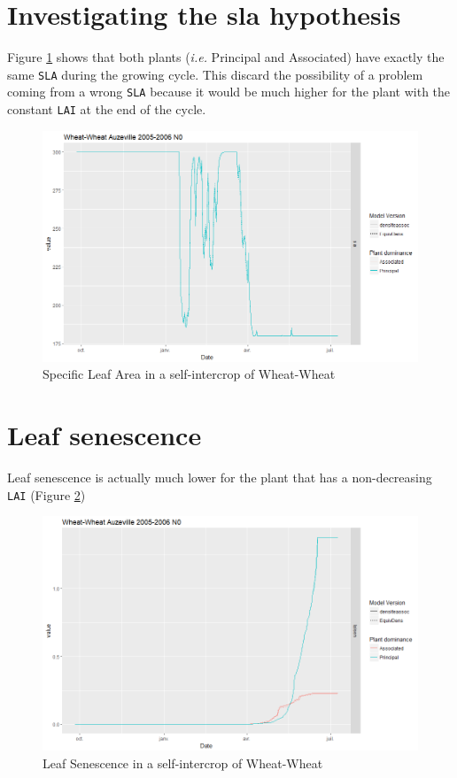 \documentclass[]{book}
\begin{document}
\hypertarget{investigating-the-sla-hypothesis}{%
\section{Investigating the sla hypothesis}\label{investigating-the-sla-hypothesis}}

Figure \ref{fig:LAISLA} shows that both plants (\emph{i.e.} Principal and Associated) have exactly the same \texttt{SLA} during the growing cycle. This discard the possibility of a problem coming from a wrong \texttt{SLA} because it would be much higher for the plant with the constant \texttt{LAI} at the end of the cycle.

\begin{figure}
\centering
\includegraphics{img/LAI_hyp_SLA.png}
\caption{\label{fig:LAISLA}Specific Leaf Area in a self-intercrop of Wheat-Wheat}
\end{figure}

\hypertarget{leaf-senescence}{%
\section{Leaf senescence}\label{leaf-senescence}}

Leaf senescence is actually much lower for the plant that has a non-decreasing \texttt{LAI} (Figure \ref{fig:Leafsen})

\begin{figure}
\centering
\includegraphics{img/Senescence.png}
\caption{\label{fig:Leafsen}Leaf Senescence in a self-intercrop of Wheat-Wheat}
\end{figure}
\end{document}
